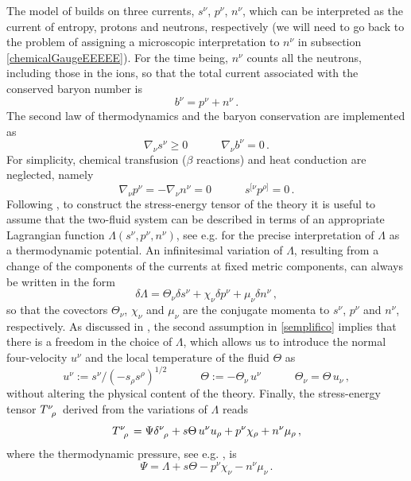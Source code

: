 \documentclass[preprints,article,accept,moreauthors,pdftex]{mdpi}
\newcommand{\spc}{\quad \quad \quad}
\begin{document}
The model of \citet{langlois98} builds on three currents, $s^\nu$, $p^\nu$, $n^\nu$, which can be interpreted as the current of entropy, protons and neutrons, respectively (we will need to go back to the problem of assigning a microscopic interpretation to $n^\nu$ in subsection \ref{chemicalGaugeEEEEE}).
For the time being,  $n^\nu$ counts all the neutrons, including those in the ions, so that the total current associated with the conserved baryon number is 
\begin{equation}\label{barbie}
b^\nu = p^\nu +n^\nu \, .
\end{equation} 
The second law of thermodynamics and the baryon conservation are implemented as
\begin{equation}
\nabla_\nu s^\nu \geq 0  \spc  \nabla_\nu b^\nu =0 \, .
\end{equation} 
For simplicity, chemical transfusion ($\beta$ reactions) and heat conduction are neglected, namely
\begin{equation}\label{semplifico}
\nabla_\nu p^\nu =-\nabla_\nu n^\nu= 0  \spc   s^{[ \nu}p^{\rho ]}=0 \, .
\end{equation}
Following \cite{langlois98}, to construct the stress-energy tensor of the theory it is useful to assume that the two-fluid system can be described in terms of an appropriate Lagrangian function $\Lambda(s^\nu,p^\nu,n^\nu)$, see e.g. \cite{Termo} for the precise interpretation of $\Lambda$ as a thermodynamic potential. 
An  infinitesimal variation of $\Lambda$, resulting from a change of the components of the currents at fixed metric components, can always be written in the form 
\begin{equation}\label{deltaLal}
\delta \Lambda = \Theta_\nu \delta s^\nu + \chi_\nu \delta p^\nu +\mu_\nu \delta n^\nu \, ,
\end{equation}
so that the covectors $\Theta_\nu$, $\chi_\nu$ and $\mu_\nu$ are the conjugate momenta to $s^\nu$, $p^\nu$ and $n^\nu$, respectively. 
As discussed in \citet{Termo}, the second assumption in \eqref{semplifico} implies that there is a freedom in the choice of $\Lambda$, which allows us to introduce the 
normal four-velocity $u^\nu$ and the local temperature of the fluid $\Theta$ as
\begin{equation}
u^\nu := {s^\nu}/(-s_\rho s^\rho)^{1/2}  \spc  
\Theta :=-\Theta_\nu \, u^\nu \spc 
\Theta_\nu = \Theta \, u_\nu \, ,
\end{equation}
without altering the physical content of the theory. 
Finally, the stress-energy tensor $T\indices{^\nu _\rho}$ derived from the variations of $\Lambda$ reads
\begin{equation}\label{tinuro}
T\indices{^\nu _\rho} = \Psi \delta\indices{^\nu _\rho} + s\Theta  \, u^\nu u_\rho +p^\nu \chi_\rho + n^\nu \mu_\rho \, ,
\end{equation} 
where  the thermodynamic pressure, see e.g. \cite{Termo}, is
\begin{equation}
\Psi = \Lambda + s\Theta  -p^\nu \chi_\nu - n^\nu \mu_\nu  \, .
\end{equation}
 
\end{document}
